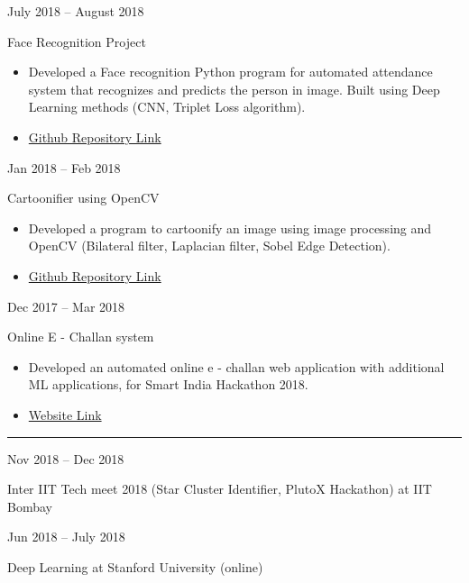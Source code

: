 \documentclass[a4paper,10pt]{article}
\newlength{\cvcolumngapwidth}
\newlength{\cvleftcolumnwidth}
\newlength{\cvrightcolumnwidth}
\newcommand{\cvsectionstyle}[1]{{\normalsize\cvsectionfont\textcolor{cvsectioncolor}{#1}}}
\newcommand{\cvtitlestyle}[1]{{\large\cvtitlefont\textcolor{cvtitlecolor}{#1}}}
\newcommand{\cvdurationstyle}[1]{{\small\cvdurationfont\textcolor{cvdurationcolor}{#1}}}
\newlength{\cvafteritemskipamount}
\newlength{\cvaftersectionskipamount}
\newlength{\cvbetweensectionandheadingextraskipamount}
\newlength{\cvaftertitleskipamount}
\newlength{\cvparskip}
\newcommand{\cvsection}[1]{
    \begin{minipage}[t]{\cvleftcolumnwidth}
        \raggedleft\cvsectionstyle{#1}
    \end{minipage}%
    \hspace{\cvcolumngapwidth}%
    \begin{minipage}[t]{\cvrightcolumnwidth}
        \textcolor{cvrulecolor}{\rule{\cvrightcolumnwidth}{0.3mm}}
    \end{minipage}

    \vspace{\cvaftersectionskipamount}
}
\newcommand{\cvitem}[2]{
    \begin{minipage}[t]{\cvleftcolumnwidth}
        \raggedleft #1
    \end{minipage}%
    \hspace{\cvcolumngapwidth}%
    \begin{minipage}[t]{\cvrightcolumnwidth}
        \setlength{\parskip}{\cvparskip} #2
    \end{minipage}

    \vspace{\cvafteritemskipamount}
}
\newcommand{\cvtitle}[1]{
    \cvtitlestyle{#1}

    \vspace{\cvaftertitleskipamount}
    \vspace{-\cvparskip}
}
\begin{document}
\cvitem{
    \cvdurationstyle{July 2018 -- August 2018}
}{
    \cvtitle{Face Recognition Project}

    \begin{itemize}[leftmargin=*]
        \item Developed a Face recognition Python program for automated attendance system that recognizes and predicts the person in image. Built using Deep Learning methods (CNN, Triplet Loss algorithm).
        \item \href{https://github.com/RathoreDevansh08/CSpuare\_FaceRecognition}{Github Repository Link}
        
    \end{itemize}
}

\cvitem{
    \cvdurationstyle{Jan 2018 -- Feb 2018}
}{
    \cvtitle{Cartoonifier using OpenCV}
    \begin{itemize}[leftmargin=*]
        \item Developed a program to cartoonify an image using image processing and OpenCV (Bilateral filter, Laplacian filter, Sobel Edge Detection).
        \item \href{https://github.com/RathoreDevansh08/Cartoonifier}{Github Repository Link}
        
    \end{itemize}
}

\cvitem{
    \cvdurationstyle{Dec 2017 -- Mar 2018}
}{
    \cvtitle{Online E - Challan system}
    \begin{itemize}[leftmargin=*]
        \item Developed an automated online e - challan web application with additional ML applications, for Smart India Hackathon 2018.
        \item \href{http://iit.pscquestion.in/}{Website Link}
        
    \end{itemize}
}



\cvsection{TRAINING AND WORKSHOPS}

\vspace{\cvbetweensectionandheadingextraskipamount}

\cvitem{
    \cvdurationstyle{Nov 2018 -- Dec 2018}
}{

    \cvtitle{ Inter IIT Tech meet 2018 (Star Cluster Identifier, PlutoX Hackathon) at IIT Bombay}
}

\cvitem{
    \cvdurationstyle{Jun 2018 -- July 2018}
}{
    \cvtitle{Deep Learning at Stanford University (online)}
}
\end{document}
